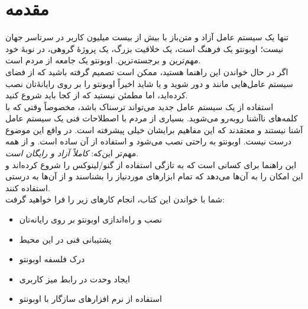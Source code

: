 \chapter{مقدمه}
\emph{} تنها یک سیستم عامل آزاد و متن‌باز  با بیش از بیست میلیون کاربر در سرتاسر جهان نیست؛ اوبونتو یک فرهنگ است، یک خلاقیت بزرگ، یک پروژهٔ گروهی، در نوبهٔ خود مهم‌ترین و برجسته‌ترین. اوبونتو یک جامعه از مردم است.\\
اگر در حال خواندن این راهنما هستید، ممکن است تصمیم گرفته باشید که از فضای سیستم عامل‌هایی مانند  و  دور شوید و یا شاید اخیراً اوبونتو را بر روی رایانهٔ‌تان نصب کرده‌اید، اما مطمئن نیستید که از کجا باید شروع کنید.\\
استفاده از یک سیستم عامل جدید می‌تواند ترسناک باشد، مخصوصاً وقتی که با کلمه‌های ناآشنا روبه‌رو می‌شوید. بسیاری از مردم با اصطلاحات فنی یک سیستم عامل آشنا نیستند و معتقدند که این مفاهیم برایشان خیلی پیشرفته است. در واقع این موضوع درست نیست. اوبونتو به راحتی نصب می‌شود و استفاده از آن ساده است. و از همه مهم‌تر این‌که: \emph{کاملاً آزاد و  رایگان است}.\\

این راهنما برای کسانی است که به تازگی استفاده از گنو/لینوکس را شروع کرده‌اند و این امکان را به آن‌ها می‌دهد که تمام ابزارهای موردنیاز را بشناسند و از آن‌ها به درستی استفاده کنند.\\
شما با خواندن این کتاب، انجام کارهای زیر را فرا خواهید گرفت:
\begin{itemize}
\item نصب و راه‌اندازی اوبونتو بر روی رایانه‌تان
\item پشتیبانی فنی در این محیط
\item درک فلسفه اوبونتو
\item ایجاد وحدت در رابط میز کاربری
\item استفاده از نرم افزارهای سازگار با اوبونتو
\end{itemize}
